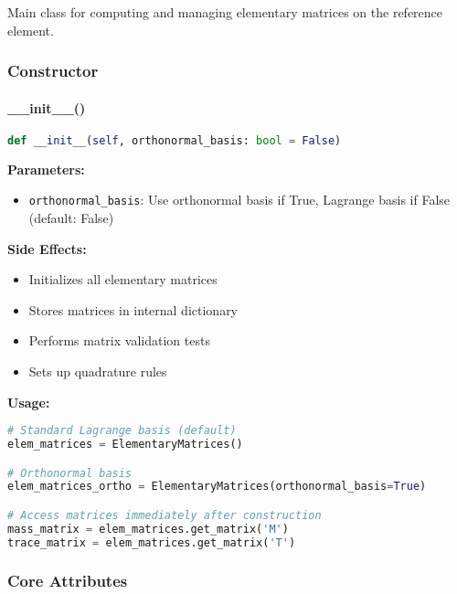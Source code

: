 Main class for computing and managing elementary matrices on the reference element.

\subsubsection{Constructor}

\paragraph{\_\_init\_\_()}\leavevmode
\begin{lstlisting}[language=Python, caption=ElementaryMatrices Constructor]
def __init__(self, orthonormal_basis: bool = False)
\end{lstlisting}

\textbf{Parameters:}
\begin{itemize}
    \item \texttt{orthonormal\_basis}: Use orthonormal basis if True, Lagrange basis if False (default: False)
\end{itemize}

\textbf{Side Effects:}
\begin{itemize}
    \item Initializes all elementary matrices
    \item Stores matrices in internal dictionary
    \item Performs matrix validation tests
    \item Sets up quadrature rules
\end{itemize}

\textbf{Usage:}
\begin{lstlisting}[language=Python, caption=Constructor Usage Examples]
# Standard Lagrange basis (default)
elem_matrices = ElementaryMatrices()

# Orthonormal basis
elem_matrices_ortho = ElementaryMatrices(orthonormal_basis=True)

# Access matrices immediately after construction
mass_matrix = elem_matrices.get_matrix('M')
trace_matrix = elem_matrices.get_matrix('T')
\end{lstlisting}

\subsubsection{Core Attributes}

